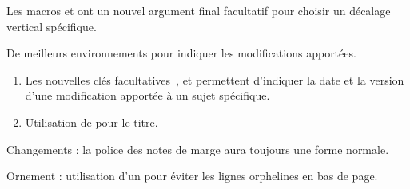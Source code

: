 \documentclass[12pt, a4paper, theme = color]{tutodoc}
\begin{document}
\begin{tdocnew}
	\item Les macros  et  ont un nouvel argument final facultatif  pour choisir un décalage vertical spécifique.

	\item De meilleurs environnements pour indiquer les modifications apportées.
	\begin{enumerate}
		\item Les nouvelles clés facultatives \,,  et  permettent d'indiquer la date et la version d'une modification apportée à un sujet spécifique.

		\item Utilisation de  pour le titre.
	\end{enumerate}
\end{tdocnew} 


\begin{tdocupdate}
	\item Changements : la police des notes de marge aura toujours une forme normale.

	\item Ornement : utilisation d'un \tdocinlatex{\cleaders} pour éviter les lignes orphelines en bas de page.
\end{tdocupdate}
\end{document}
